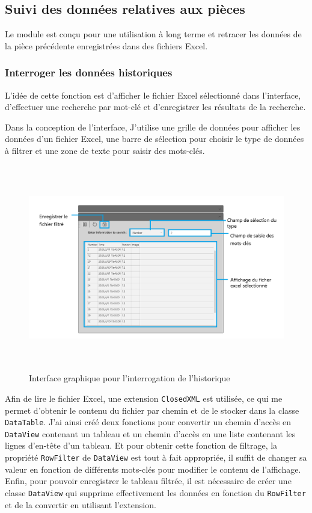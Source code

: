 \subsection{Suivi des données relatives aux pièces}
Le module est conçu pour une utilisation à long terme et retracer les données de la pièce précédente enregistrées dans des fichiers \gls{Excel}. 

\subsubsection{Interroger les données historiques}
L'idée de cette fonction est d'afficher le fichier \gls{Excel} sélectionné dans l'interface, d'effectuer une recherche par mot-clé et d'enregistrer les résultats de la recherche. 

Dans la conception de l'interface, J'utilise une grille de données pour afficher les données d'un fichier \gls{Excel}, une barre de sélection pour choisir le type de données à filtrer et une zone de texte pour saisir des mots-clés. 
\begin{figure}[H]
    \centering
    \includegraphics[height=9cm]{ressources/images/information_search.png}
    \caption{Interface graphique pour l'interrogation de l'historique }
\end{figure}

Afin de lire le fichier Excel, une extension \texttt{ClosedXML} est utilisée, ce qui me permet d'obtenir le contenu du fichier par chemin et de le stocker dans la classe \texttt{DataTable}.  J'ai ainsi créé deux fonctions pour convertir un chemin d'accès en \texttt{DataView} contenant un tableau et un chemin d'accès en une liste contenant les lignes d'en-tête d'un tableau. Et pour obtenir cette fonction de filtrage, la propriété \texttt{RowFilter} de \texttt{DataView} est tout à fait appropriée, il suffit de changer sa valeur en fonction de différents mots-clés pour modifier le contenu de l'affichage. Enfin, pour pouvoir enregistrer le tableau filtrée, il est nécessaire de créer une classe \texttt{DataView} qui supprime effectivement les données en fonction du \texttt{RowFilter} et de la convertir en utilisant l'extension. 

